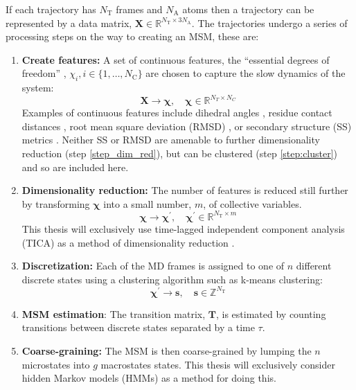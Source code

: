 If  each trajectory has $N_{\mathrm{T}}$ frames and $N_{\mathrm{A}}$ atoms then a trajectory can be represented by a data matrix, $\mathbf{X} \in \mathbb{R}^{N_{\mathrm{T}} \times 3N_{\mathrm{A}}}$. The trajectories  undergo a series of processing steps on the way to creating an MSM, these are: 
\begin{enumerate}
    \item \textbf{Create features:} A set of continuous features, the ``essential degrees of freedom'' \cite{schutteDirectApproachConformational1999}, $\chi_{i}, i \in \{1,\dots, N_{\mathrm{C}} \}$ are chosen to capture the slow dynamics of the system:
    \begin{equation*}
        \mathbf{X}  \rightarrow \bm{\chi},\quad \bm{\chi} \in \mathbb{R}^{N_{T} \times N_{C}}
    \end{equation*}
    Examples of continuous features include dihedral angles \cite{noeHierarchicalAnalysisConformational2007,choderaLongTimeProtein2006a,kubeCoarseGrainingMethod2007b,bucheteCoarseMasterEquations2008a}, residue contact distances \cite{stanleyKineticModulationDisordered2014,zhouDistributionReciprocalInteratomic2012,shuklaConformationalHeterogeneityCalmodulin2016}, root mean square deviation (RMSD) \cite{noe2009constructing,bowmanAtomisticFoldingSimulations2011a}, or secondary structure (SS) metrics \cite{muffKineticAnalysisMolecular2008}. Neither SS or RMSD are amenable to further dimensionality reduction (step \ref{step_dim_red}), but can be clustered (step \ref{step:cluster}) and so are included here. 
    \item \textbf{Dimensionality reduction:} The number of features is reduced still further by transforming $\bm{\chi}$ into a small number, $m$, of collective variables. 
    \begin{equation*}
        \bm{\chi}  \rightarrow \bm{\chi}^{\prime},\quad \bm{\chi}^{\prime} \in \mathbb{R}^{N_{\mathrm{T}} \times m}
    \end{equation*}
    This thesis will exclusively use time-lagged independent component analysis (TICA)  as a method of dimensionality reduction \cite{perez-hernandezIdentificationSlowMolecular2013a} \cite{schwantesImprovementsMarkovState2013}.\label{step_dim_red}
    \item \textbf{Discretization:} Each of the MD frames is assigned to one of $n$ different discrete states using a clustering algorithm such as k-means \cite{lloydLeastSquaresQuantization1982} clustering: 
    \begin{equation*}
        \bm{\chi}^{\prime} \rightarrow \mathbf{s},\quad \mathbf{s} \in \mathbb{Z}^{N_{\mathrm{T}}}
    \end{equation*}\label{step:cluster}
    \item \textbf{MSM estimation}: The transition matrix, $\mathbf{T}$, is estimated by counting transitions between discrete states separated by a time $\tau$. 
    \item \textbf{Coarse-graining:} The MSM is then coarse-grained by lumping the $n$ microstates into $g$ macrostates states. This thesis will exclusively consider hidden Markov models (HMMs) as a method for doing this. 
\end{enumerate}

